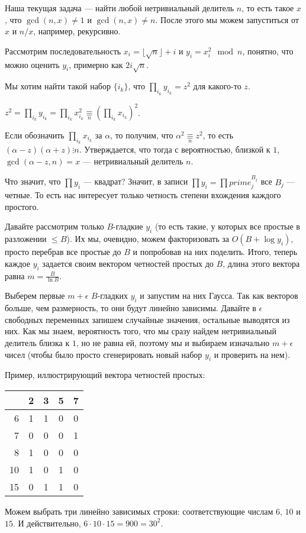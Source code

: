 Наша текущая задача --- найти любой нетривиальный делитель $n$, то есть такое $x$, что $\gcd(n, x) \ne 1$ и $\gcd(n, x) \ne n$.
После этого мы можем запуститься от $x$ и $n/x$, например, рекурсивно.

Рассмотрим последовательность $x_i = \lfloor \sqrt{n} \rfloor + i$ и $y_i = x_i^2 \mod n$, понятно, что можно оценить $y_i$, примерно как $2i\sqrt{n}$.

Мы хотим найти такой набор $\{i_k\}$, что $\prod\limits_{i_k} y_{i_k} = z^2$ для какого-то $z$.

$z^2 = \prod\limits_{i_k} y_{i_k} = \prod\limits_{i_k} x_{i_k}^2 \underset{n}{\equiv} (\prod\limits_{i_k} x_{i_k})^2$.

Если обозначить $\prod\limits_{i_k} x_{i_k}$ за $\alpha$, то получим, что $\alpha^2 \underset{n}{\equiv} z^2$, то есть $(\alpha - z)(\alpha + z) \vdots n$.
Утверждается, что тогда с вероятностью, близкой к $1$, $\gcd(\alpha - z, n)=x$ --- нетривиальный делитель $n$.

Что значит, что $\prod y_i$ --- квадрат? Значит, в записи $\prod y_i = \prod prime_j^{B_j}$ все $B_j$ --- четные.
То есть нас интересует только четность степени вхождения каждого простого.

Давайте рассмотрим только $B$-гладкие $y_i$ (то есть такие, у которых все простые в разложении $\leqslant B$).
Их мы, очевидно, можем факторизовать за $O(B + \log y_i)$, просто перебрав все простые до $B$ и попробовав на них поделить.
Итого, теперь каждое $y_i$ задается своим вектором четностей простых до $B$, длина этого вектора равна $m = \frac{B}{\ln B}$.

Выберем первые $m + \epsilon$ $B$-гладких $y_i$ и запустим на них Гаусса.
Так как векторов больше, чем размерность, то они будут линейно зависимы.
Давайте в $\epsilon$ свободных переменных запишем случайные значения, остальные выводятся из них.
Как мы знаем, вероятность того, что мы сразу найдем нетривиальный делитель близка к $1$, но не равна ей, поэтому мы и выбираем изначально $m+\epsilon$ чисел 
(чтобы было просто сгенерировать новый набор $y_i$ и проверить на нем).

Пример, иллюстрирующий вектора четностей простых:
\begin{exmp}
	\begin{tabular}{ r | c c c c}
		   & 2 & 3 & 5 & 7 \\
		\hline 
		6  & 1 & 1 & 0 & 0 \\
		7  & 0 & 0 & 0 & 1 \\
		8  & 1 & 0 & 0 & 0 \\
		10 & 1 & 0 & 1 & 0 \\
		15 & 0 & 1 & 1 & 0 \\
	\end{tabular}

	Можем выбрать три линейно зависимых строки: соответствующие числам $6$, $10$ и $15$.
	И действительно, $6 \cdot 10 \cdot 15 = 900 = 30^2$.
\end{exmp}


